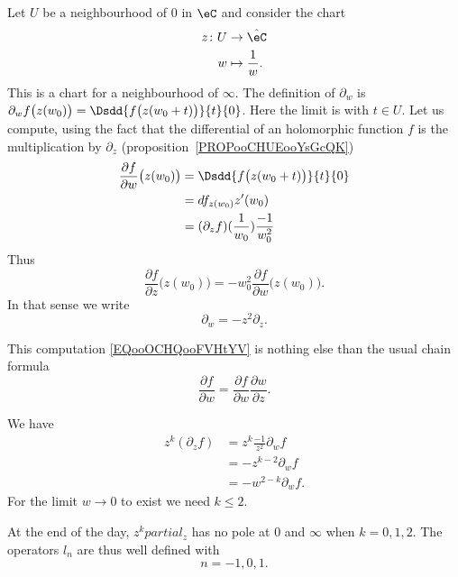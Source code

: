 Let \( U\) be a neighbourhood of \( 0\) in \( \eC\) and consider the chart
\begin{equation}
    \begin{aligned}
        z\colon U&\to \hat \eC \\
        w&\mapsto \frac{1}{ w }.
    \end{aligned}
\end{equation}
This is a chart for a neighbourhood of \( \infty\). The definition of \( \partial_w\) is \( \partial_wf\big( z(w_0) \big)=\Dsdd{ f\big( z(w_0+t) \big) }{t}{0}  \). Here the limit is with \( t\in U\). Let us compute, using the fact that the differential of an holomorphic function \( f\) is the multiplication by \( \partial_z\) (proposition~\ref{PROPooCHUEooYsGcQK})
\begin{subequations}        \label{EQooOCHQooFVHtYV}
    \begin{align}
        \frac{ \partial f }{ \partial w }\big( z(w_0) \big)&=\Dsdd{ f\big( z(w_0+t) \big) }{t}{0}\\
        &=df_{z(w_0)}z'(w_0)\\
        &=(\partial_zf)(\frac{1}{ w_0 })\frac{ -1 }{ w_0^2 }
    \end{align}
\end{subequations}
Thus
\begin{equation}
    \frac{ \partial f }{ \partial z }\big( z(w_0) \big)=-w_0^2\frac{ \partial f }{ \partial w }\big( z(w_0) \big).
\end{equation}
In that sense we write
\begin{equation}
    \partial_w=-z^2\partial_z.
\end{equation}

\begin{remark}
    This computation \eqref{EQooOCHQooFVHtYV} is nothing else than the usual chain formula
    \begin{equation}
        \frac{ \partial f }{ \partial w }=\frac{ \partial f }{ \partial w }\frac{ \partial w }{ \partial z }.
    \end{equation}
\end{remark}

We have
\begin{subequations}
    \begin{align}
        z^k(\partial_zf)&=z^k\frac{-1}{ z^2 }\partial_wf\\
        &=-z^{k-2}\partial_wf\\
        &=-w^{2-k}\partial_wf.
    \end{align}
\end{subequations}
For the limit \( w\to 0\) to exist we need \( k\leq 2\).

At the end of the day, \( z^kpartial_z\) has no pole at \( 0\) and \( \infty\) when \( k=0,1,2\). The operators \( l_n\) are thus well defined with
\begin{equation}
    n=-1,0,1.
\end{equation}

